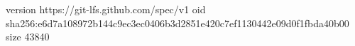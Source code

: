 version https://git-lfs.github.com/spec/v1
oid sha256:e6d7a108972b144c9ec3ec0406b3d2851e420c7ef1130442e09d0f1fbda40b00
size 43840
